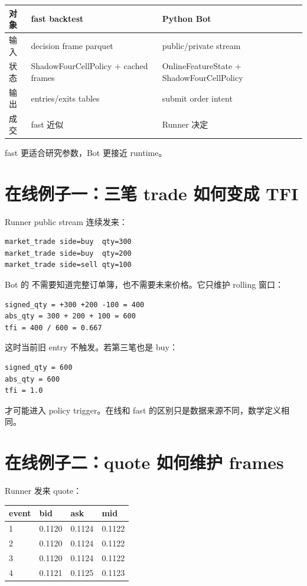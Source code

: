 \begin{longtable}{p{}p{}p{}}
\toprule
对象 & fast backtest & Python Bot \\
\midrule
输入 & decision frame parquet & public/private stream \\
状态 & ShadowFourCellPolicy + cached frames & OnlineFeatureState + ShadowFourCellPolicy \\
输出 & entries/exits tables & submit order intent \\
成交 & fast 近似 & Runner 决定 \\
\bottomrule
\end{longtable}

fast 更适合研究参数，Bot 更接近 runtime。

\section{在线例子一：三笔 trade 如何变成 TFI}

Runner public stream 连续发来：

\begin{lstlisting}
market_trade side=buy  qty=300
market_trade side=buy  qty=200
market_trade side=sell qty=100
\end{lstlisting}

Bot 的  不需要知道完整订单簿，也不需要未来价格。它只维护 rolling 窗口：

\begin{lstlisting}
signed_qty = +300 +200 -100 = 400
abs_qty = 300 + 200 + 100 = 600
tfi = 400 / 600 = 0.667
\end{lstlisting}

这时当前旧 entry 不触发。若第三笔也是 buy：

\begin{lstlisting}
signed_qty = 600
abs_qty = 600
tfi = 1.0
\end{lstlisting}

才可能进入 policy trigger。在线和 fast 的区别只是数据来源不同，数学定义相同。

\section{在线例子二：quote 如何维护 frames}

Runner 发来 quote：

\begin{longtable}{p{}p{}p{}p{}}
\toprule
event & bid & ask & mid \\
\midrule
1 & 0.1120 & 0.1124 & 0.1122 \\
2 & 0.1120 & 0.1124 & 0.1122 \\
3 & 0.1120 & 0.1124 & 0.1122 \\
4 & 0.1121 & 0.1125 & 0.1123 \\
\bottomrule
\end{longtable}

